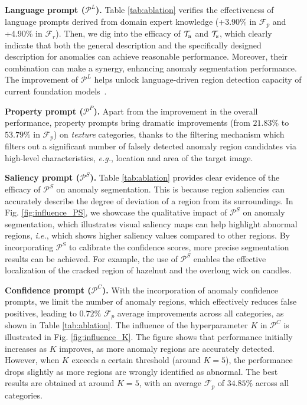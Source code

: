 \documentclass{article}
\begin{document}
\noindent\textbf{Language prompt ($\mathcal{P}^L$).} Table \ref{tab:ablation} verifies the effectiveness of language prompts derived from domain expert knowledge (+3.90\% in $\mathcal{F}_p$ and +4.90\% in $\mathcal{F}_r$). Then, we dig into the efficacy of $\mathcal{T}_{\rm a}$ and $\mathcal{T}_ {\rm s}$, which clearly indicate that both the general description and the specifically designed description for anomalies can achieve reasonable performance. Moreover, their combination can make a synergy, enhancing anomaly segmentation performance. The improvement of $\mathcal{P}^L$ helps unlock language-driven region detection capacity of current foundation models~\cite{liu2023grounding,kirillov2023segment}. 

\noindent\textbf{Property prompt ($\mathcal{P}^P$).} Apart from the improvement in the overall performance, property prompts bring dramatic improvements (from $21.83\%$ to $53.79\%$ in $\mathcal{F}_p$) on \textit{texture} categories, thanks to the filtering mechanism which filters out a significant number of falsely detected anomaly region candidates via high-level characteristics, \textit{e.g.}, location and area of the target image. 

\noindent\textbf{Saliency prompt ($\mathcal{P}^S$).} Table \ref{tab:ablation} provides clear evidence of the efficacy of $\mathcal{P}^S$ on anomaly segmentation. This is because region saliencies can accurately describe the degree of deviation of a region from its surroundings. In Fig. \ref{fig:influence_PS}, we showcase the qualitative impact of $\mathcal{P}^S$ on anomaly segmentation, which illustrates visual saliency maps can help highlight abnormal regions, \textit{i.e.}, which shows higher saliency values compared to other regions. By incorporating $\mathcal{P}^S$ to calibrate the confidence scores, more precise segmentation results can be achieved. For example, the use of $\mathcal{P}^S$ enables the effective localization of the cracked region of hazelnut and the overlong wick on candles. 

\noindent\textbf{Confidence prompt ($\mathcal{P}^C$).} 
 With the incorporation of anomaly confidence prompts, we limit the number of anomaly regions, which effectively reduces false positives, leading to $0.72\%$ $\mathcal{F}_p$ average improvements across all categories, as shown in Table \ref{tab:ablation}.
The influence of the hyperparameter $K$ in $\mathcal{P}^C$ is illustrated in Fig. \ref{fig:influence_K}. The figure shows that performance initially increases as $K$ improves, as more anomaly regions are accurately detected. However, when $K$ exceeds a certain threshold (around $K=5$), the performance drops slightly as more regions are wrongly identified as abnormal. The best results are obtained at around $K=5$, with an average $\mathcal{F}_{p}$ of $34.85\%$  across all categories.
\end{document}
